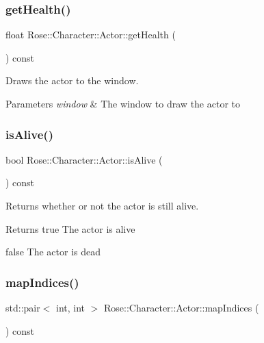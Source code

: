 \subsubsection{\texorpdfstring{getHealth()}{getHealth()}}
{\footnotesize\ttfamily float Rose\+::\+Character\+::\+Actor\+::get\+Health (\begin{DoxyParamCaption}{ }\end{DoxyParamCaption}) const\hspace{0.3cm}{\ttfamily [virtual]}}



Draws the actor to the window. 


\begin{DoxyParams}{Parameters}
{\em window} & The window to draw the actor to \\
\hline
\end{DoxyParams}
\mbox{\label{classRose_1_1Character_1_1Actor_adda43e4e628cbfb11c36ab909aceba89}} 
\subsubsection{\texorpdfstring{isAlive()}{isAlive()}}
{\footnotesize\ttfamily bool Rose\+::\+Character\+::\+Actor\+::is\+Alive (\begin{DoxyParamCaption}{ }\end{DoxyParamCaption}) const\hspace{0.3cm}{\ttfamily [virtual]}}



Returns whether or not the actor is still alive. 

\begin{DoxyReturn}{Returns}
true The actor is alive 

false The actor is dead 
\end{DoxyReturn}
\mbox{\label{classRose_1_1Character_1_1Actor_a98c5e21f71da3341eba49da5b55757e0}} 
\subsubsection{\texorpdfstring{mapIndices()}{mapIndices()}}
{\footnotesize\ttfamily std\+::pair$<$ int, int $>$ Rose\+::\+Character\+::\+Actor\+::map\+Indices (\begin{DoxyParamCaption}{ }\end{DoxyParamCaption}) const\hspace{0.3cm}{\ttfamily [protected]}}



